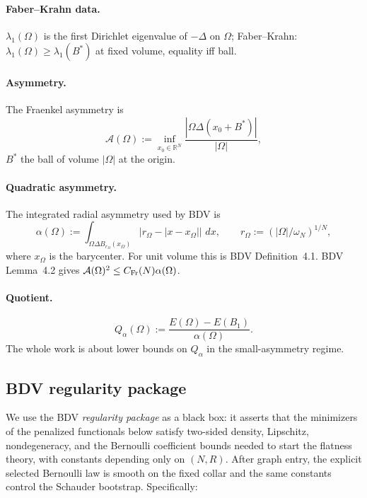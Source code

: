 \documentclass[11pt]{article}
\theoremstyle{definition}
\newcommand{\R}{\mathbb{R}}
\newcommand{\abs}[1]{\left|#1\right|}
\renewcommand{\d}{\,d}
\begin{document}
\paragraph{Faber--Krahn data.}
$\lambda_1(\Omega)$ is the first Dirichlet eigenvalue of $-\Delta$ on
$\Omega$; Faber--Krahn: $\lambda_1(\Omega)\ge\lambda_1(B^*)$ at fixed
volume, equality iff ball.

\paragraph{Asymmetry.}
The Fraenkel asymmetry is
\[
\mathcal A(\Omega):=
\inf_{x_0\in\R^N}\frac{\abs{\Omega\Delta(x_0+B^*)}}{\abs{\Omega}},
\]
$B^*$ the ball of volume $\abs{\Omega}$ at the origin.

\paragraph{Quadratic asymmetry.}
The integrated radial asymmetry used by BDV is
\[
\alpha(\Omega):=
\int_{\Omega\Delta B_{r_\Omega}(x_\Omega)}
\bigl|r_\Omega-\abs{x-x_\Omega}\bigr|\,\d x,
\qquad
r_\Omega:=(\abs{\Omega}/\omega_N)^{1/N},
\]
where $x_\Omega$ is the barycenter. For unit volume this is BDV Definition~4.1.
BDV Lemma~4.2 gives $\mathcal A(\Omega)^2\le C_{\rm Fr}(N)\alpha(\Omega)$.

\paragraph{Quotient.}
\[
Q_\alpha(\Omega):=\frac{E(\Omega)-E(B_1)}{\alpha(\Omega)}.
\]
The whole work is about lower bounds on $Q_\alpha$ in the small-asymmetry regime.

\subsection{BDV regularity package}

We use the BDV \emph{regularity package} as a black box: it asserts that the
minimizers of the penalized functionals below satisfy two-sided density,
Lipschitz, nondegeneracy, and the Bernoulli coefficient bounds needed to start
the flatness theory, with constants depending only on $(N,R)$. After graph
entry, the explicit selected Bernoulli law is smooth on the fixed collar and
the same constants control the Schauder bootstrap. Specifically:
\end{document}
